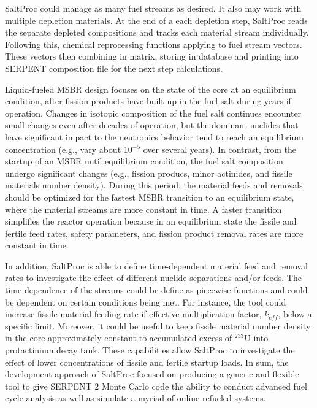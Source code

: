 SaltProc could manage as many fuel streams as desired. It also may work with multiple depletion materials. At the end of a each depletion step, SaltProc reads the separate depleted compositions and tracks each material stream individually. Following this, chemical reprocessing functions applying to fuel stream vectors. These vectors then combining in matrix, storing in database and printing into SERPENT composition file for the next step calculations.

Liquid-fueled \gls{MSBR} design focuses on the state of the core at an equilibrium condition, after fission products have built up in the fuel salt during years if operation. Changes in isotopic composition of the fuel salt continues encounter small changes even after decades of operation, but the dominant nuclides that have significant impact to the neutronics behavior tend to reach an equilibrium concentration (e.g., vary about 10$^{-5}$ over several years). In contrast, from the startup of an \gls{MSBR} until equilibrium condition, the fuel salt composition undergo significant changes (e.g., fission producs, minor actinides, and fissile materials number density). During this period, the material feeds and removals should be optimized for the fastest \gls{MSBR} transition to an equilibrium state, where the material streams are more constant in time. A faster transition simplifies the reactor operation because in an equilibrium state the fissile and fertile feed rates, safety parameters, and fission product removal rates are more constant in time.

In addition, SaltProc is able to define time-dependent material feed and removal rates to investigate the effect of different nuclide separations and/or feeds. The time dependence of the streams could be define as piecewise functions and could be dependent on certain conditions being met. For instance, the tool could increase fissile material feeding rate if effective multiplication factor, $k_{eff}$, below a specific limit. Moreover, it could be useful to keep fissile material number density in the core approximately constant to accumulated excess of $^{233}$U into protactinium decay tank. These capabilities allow SaltProc to investigate the effect of lower concentrations of fissile and fertile startup loads. In sum, the development approach of SaltProc focused on producing a generic and flexible tool to give SERPENT 2 Monte Carlo code the ability to conduct advanced fuel cycle analysis as well as simulate a myriad of online refueled systems.
